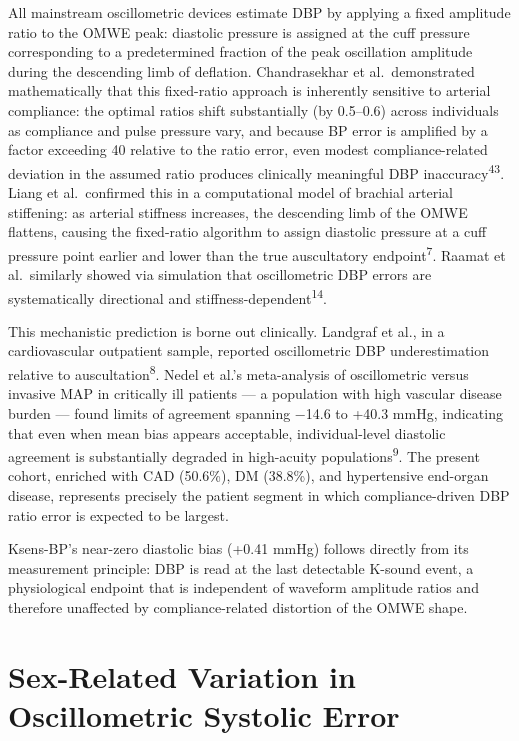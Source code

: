 \documentclass[
  12pt,
  letterpaper,
  openany,
  oneside]{book}
\begin{document}
All mainstream oscillometric devices estimate DBP by applying a fixed
amplitude ratio to the OMWE peak: diastolic pressure is assigned at the
cuff pressure corresponding to a predetermined fraction of the peak
oscillation amplitude during the descending limb of deflation.
Chandrasekhar et al.~demonstrated mathematically that this fixed-ratio
approach is inherently sensitive to arterial compliance: the optimal
ratios shift substantially (by 0.5--0.6) across individuals as
compliance and pulse pressure vary, and because BP error is amplified by
a factor exceeding 40 relative to the ratio error, even modest
compliance-related deviation in the assumed ratio produces clinically
meaningful DBP inaccuracy\textsuperscript{43}. Liang et al.~confirmed
this in a computational model of brachial arterial stiffening: as
arterial stiffness increases, the descending limb of the OMWE flattens,
causing the fixed-ratio algorithm to assign diastolic pressure at a cuff
pressure point earlier and lower than the true auscultatory
endpoint\textsuperscript{7}. Raamat et al.~similarly showed via
simulation that oscillometric DBP errors are systematically directional
and stiffness-dependent\textsuperscript{14}.

This mechanistic prediction is borne out clinically. Landgraf et al., in
a cardiovascular outpatient sample, reported oscillometric DBP
underestimation relative to auscultation\textsuperscript{8}. Nedel et
al.'s meta-analysis of oscillometric versus invasive MAP in critically
ill patients --- a population with high vascular disease burden ---
found limits of agreement spanning −14.6 to +40.3 mmHg, indicating that
even when mean bias appears acceptable, individual-level diastolic
agreement is substantially degraded in high-acuity
populations\textsuperscript{9}. The present cohort, enriched with CAD
(50.6\%), DM (38.8\%), and hypertensive end-organ disease, represents
precisely the patient segment in which compliance-driven DBP ratio error
is expected to be largest.

Ksens-BP's near-zero diastolic bias (+0.41 mmHg) follows directly from
its measurement principle: DBP is read at the last detectable K-sound
event, a physiological endpoint that is independent of waveform
amplitude ratios and therefore unaffected by compliance-related
distortion of the OMWE shape.

\section{Sex-Related Variation in Oscillometric Systolic
Error}\label{sex-related-variation-in-oscillometric-systolic-error}
\end{document}
